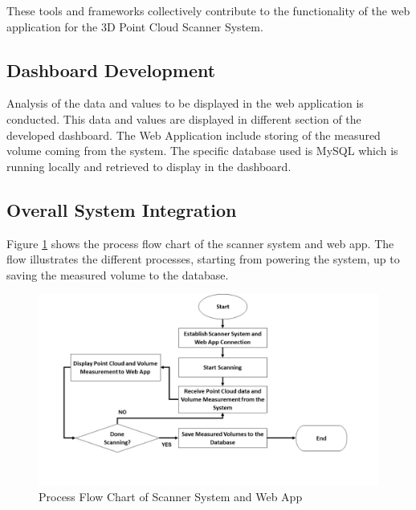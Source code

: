 These tools and frameworks collectively contribute to the functionality of the web application for the 3D Point Cloud Scanner System.

\subsection{Dashboard Development}
Analysis of the data and values to be displayed in the web application is conducted. This data and values are displayed in different section of the developed dashboard. The Web Application include storing of the measured volume coming from the system. The specific database used is MySQL which is running locally and retrieved to display in the dashboard.
\subsection{Overall System Integration}
\label{ch3:subsec:overall-system-integration}

Figure \ref{ch3:fig:web_app_connection} shows the process flow chart of the scanner system and web app. The flow illustrates the different processes, starting from powering the system, up to saving the measured volume to the database.

\begin{figure}[H]
	\centering
	\includegraphics[width=1\textwidth]{Figures/process-flow}
	\caption{Process Flow Chart of Scanner System and Web App}
	\label{ch3:fig:web_app_connection}
\end{figure}

